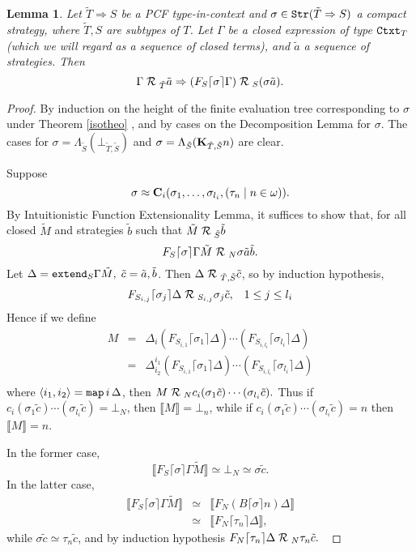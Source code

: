 \documentclass[11pt]{article}
\newtheorem{lemma}[theorem]{Lemma}
\newcommand{\lang}{\langle}
\newcommand{\rang}{\rangle}
\begin{document}
\begin{lemma}\label{522}
Let $\tilde{T}\Rightarrow S$ be a PCF type-in-context and
$\sigma\in{\tt Str}(\tilde{T}\Rightarrow S)$ a compact strategy, where
$\tilde{T},S$ are subtypes of $T$. Let $\Gamma$ be a closed expression
of type ${\tt Ctxt}_T$ (which we will regard as a sequence of
closed terms), and $\tilde{a}$ a sequence of strategies.
Then
$$\Gamma{\; \cal R\; }_{\tilde{T}}\tilde{a} \Rightarrow (F_S\lceil
\sigma\rceil\Gamma){\; \cal R\; }_S(\sigma\tilde{a}). $$
\end{lemma}

\begin{proof} By induction on the height of the finite evaluation
tree corresponding to $\sigma$ under Theorem \ref{isotheo} , and
by cases on the Decomposition Lemma for $\sigma$. The cases for
$\sigma=\Lambda_{\tilde{S}}(\bot_{\tilde{T},\tilde{S}}) $ and
$\sigma= \Lambda_{\tilde{S}}( {\bf K}_{\tilde{T},\tilde{S}}n)$ are
clear.

Suppose $$\sigma\approx {\bf
  C}_i(\sigma_1,\dots,\sigma_{l_i},(\tau_n\mid n\in\omega)).$$
By Intuitionistic Function Extensionality Lemma, it suffices to show
that, for all closed $\tilde{M}$ and
strategies $\tilde{b}$ such that $\tilde{M}{\; \cal R\; }_{\tilde{S}}\tilde{b}$
$$F_S\lceil \sigma\rceil
\Gamma\tilde{M}{\; \cal R\; }_N\sigma\tilde{a}\tilde{b}.$$
Let $\Delta={\tt extend}_S\Gamma\tilde{M},\;
\tilde{c}=\tilde{a},\tilde{b}$. Then
$\Delta{\; \cal R\; }_{\tilde{T},\tilde{S}}\tilde{c}$,
so by induction hypothesis,
$$F_{S_{i,j}}\lceil\sigma_j\rceil\Delta{\; \cal R\; }_{S_{i,j}}\sigma_j\tilde{c},\;\;\;
1\leq j\leq l_i$$
Hence if we define
\[\begin{array}{lll}
M &=&
\Delta_i(F_{S_{i,1}}\lceil\sigma_1\rceil\Delta)\cdots(F_{S_{i,l_i}}\lceil
\sigma_{l_i}\rceil\Delta)\\
&=& \Delta^{i_1}_{i_2}(F_{S_{i,1}}\lceil\sigma_1\rceil\Delta)\cdots
(F_{S_{i,l_i}}\lceil\sigma_{l_i}\rceil\Delta)\\
\end{array}\]
where $\lang i_1,i_2\rang={\tt map} \, i \, \Delta$, then $M{\; \cal R\; }_N
c_i(\sigma_1\tilde{c}) \cdots(\sigma_{l_i}\tilde{c}).$ Thus if
$c_i(\sigma_1\tilde{c}) \cdots(\sigma_{l_i}\tilde{c})=\bot_N$, then
$\llbracket M\rrbracket =\bot_n$, while if $ c_i(\sigma_1\tilde{c})
\cdots(\sigma_{l_i}\tilde{c}) = n$ then $\llbracket M\rrbracket =n$.

In the former case, $$\llbracket
F_S\lceil\sigma\rceil\Gamma\tilde{M}\rrbracket\simeq\bot_N
\simeq\sigma\tilde{c}.$$
In the latter case,
\[\begin{array}{lll}
\llbracket F_S\lceil\sigma\rceil\Gamma\tilde{M}\rrbracket
&\simeq&\llbracket F_N(B\lceil\sigma\rceil n)\Delta\rrbracket \\
&\simeq&
\llbracket F_N\lceil\tau_n\rceil\Delta\rrbracket,
\end{array}\]
while $\sigma\tilde{c}\simeq\tau_n\tilde{c}$, and by induction
hypothesis $F_N\lceil\tau_n\rceil\Delta {\; \cal R\; }_N\tau_n\tilde{c}.\;\;$
\end{proof}
\end{document}
